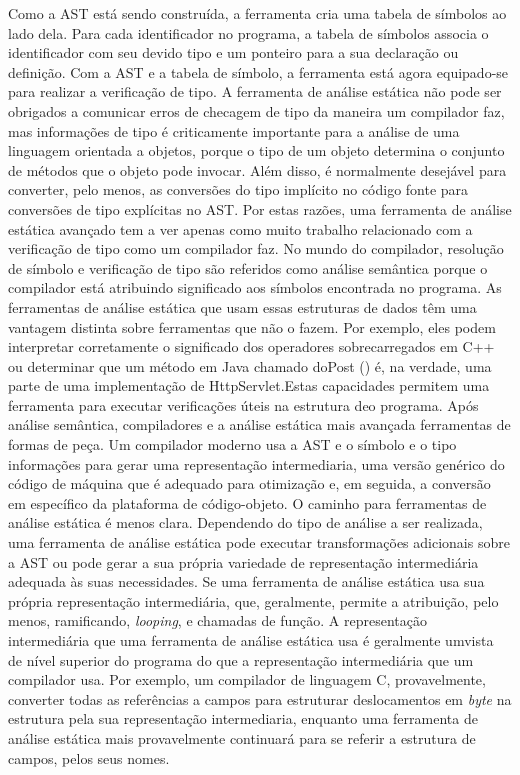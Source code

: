 	Como a AST está sendo construída, a ferramenta cria uma tabela de símbolos ao lado dela. Para cada identificador no programa, a tabela de símbolos associa o identificador com seu devido tipo e um ponteiro para a sua declaração ou definição. Com a AST e a tabela de símbolo, a ferramenta está agora equipado-se para realizar a verificação de tipo. A ferramenta de análise estática não pode ser obrigados a comunicar erros de checagem de tipo da maneira um compilador faz, mas informações de tipo é criticamente importante para a análise de uma linguagem orientada a objetos, porque o tipo de um objeto determina o conjunto de métodos que o objeto pode invocar. Além disso, é normalmente desejável para converter, pelo menos, as conversões do tipo implícito no código fonte para conversões de tipo explícitas no AST. Por estas razões, uma ferramenta de análise estática avançado tem a ver apenas como muito trabalho relacionado com a verificação de tipo como um compilador faz. No mundo do compilador, resolução de símbolo e verificação de tipo são referidos como análise semântica porque o compilador está atribuindo significado aos símbolos encontrada no programa. As ferramentas de análise estática que usam essas estruturas de dados têm uma vantagem distinta sobre ferramentas que não o fazem. Por exemplo, eles podem interpretar corretamente o significado dos operadores sobrecarregados em C++ ou determinar que um método em Java chamado doPost () é, na verdade, uma parte de uma implementação de HttpServlet.Estas capacidades permitem uma ferramenta para executar verificações úteis na estrutura deo programa. Após análise semântica, compiladores e a análise estática mais avançada ferramentas de formas de peça. Um compilador moderno usa a AST e o símbolo e o tipo informações para gerar uma representação intermediaria, uma versão genérico do código de máquina que é adequado para otimização e, em seguida, a conversão em específico da plataforma de código-objeto. O caminho para ferramentas de análise estática é menos clara. Dependendo do tipo de análise a ser realizada, uma ferramenta de análise estática pode executar transformações adicionais sobre a AST ou pode gerar a sua própria variedade de representação intermediária adequada às suas necessidades. Se uma ferramenta de análise estática usa sua própria representação intermediária, que, geralmente, permite a atribuição, pelo menos, ramificando, {\it looping}, e chamadas de função. A representação intermediária que uma ferramenta de análise estática usa é geralmente umvista de nível superior do programa do que a representação intermediária que um compilador usa. Por exemplo, um compilador de linguagem C, provavelmente, converter todas as referências a campos para estruturar deslocamentos em {\it byte} na estrutura pela sua representação intermediaria, enquanto uma ferramenta de análise estática mais provavelmente continuará para se referir a estrutura de campos, pelos seus nomes.\\

